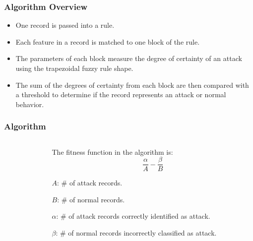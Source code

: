 \documentclass{beamer}
\begin{document}
\begin{frame}
	\frametitle{Algorithm Overview}
	\begin{itemize}
		\item One record is passed into a rule.
		\item Each feature in a record is matched to one block of the rule.
		\item The parameters of each block measure the degree of certainty of an attack using the trapezoidal fuzzy rule shape.
		\item The sum of the degrees of certainty from each block are then compared with a threshold to determine if the record represents an attack or normal behavior.
	\end{itemize}
\end{frame}

\begin{frame}
	\frametitle{Algorithm}
\begin{columns}
\begin{column}{0.6\textwidth}
\begin{small}
\begin{algorithmic}
    \ENDFOR    
      \ELSE {}
    \ENDIF
  \ENDFOR
  \STATE{find $A$, $B$, $\alpha$, and $\beta$  %
  
  } 
\ENDFOR
{}

\end{algorithmic}
\end{small}
\end{column}

\begin{column}{0.4\textwidth}
	The fitness function in the algorithm is:
	\begin{equation*}
	\frac{\alpha}{A} - \frac{\beta}{B}
	\end{equation*}

	$A$: \# of attack records.
	
	$B$: \# of normal records. 

	$\alpha$: \# of attack records correctly identified as attack.

	$\beta$: \# of normal records incorrectly classified as attack.
	
\end{column}
\end{columns}
\end{frame}
\end{document}
